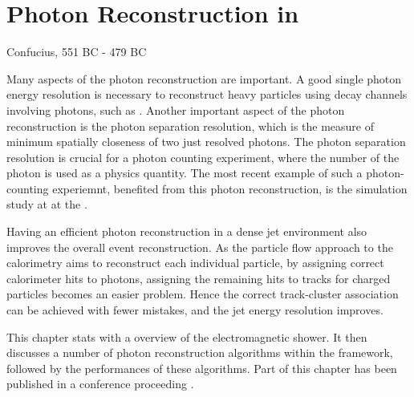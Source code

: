 \chapter{Photon Reconstruction in \pandora}
\label{chap:Photon}

%
{Confucius, 551 BC - 479 BC}

Many aspects of the photon reconstruction are important. A good single photon energy resolution is necessary to reconstruct heavy particles using decay channels involving photons, such as \HepProcess{\Ppizero\to\Pgamma\Pgamma}. Another important aspect of the photon reconstruction is the photon separation resolution, which is the measure of minimum spatially closeness of two just resolved photons. The photon separation resolution is crucial for a photon counting experiment, where the number of the photon is used as a physics quantity. The most recent example of such a photon-counting experiemnt, benefited from this photon reconstruction, is the  \HepProcess{\PHiggs \to \Pgamma \Pgamma} simulation study at  at the \CLIC \cite{Kacarevic:higgsToGammaGamma}.

Having an efficient photon reconstruction in a dense jet environment also improves the overall event reconstruction. As the particle flow approach to the calorimetry aims to reconstruct each individual particle, by assigning correct calorimeter hits to photons, assigning the remaining hits to tracks for charged particles becomes an easier problem. Hence the correct track-cluster association can be achieved with fewer mistakes, and the jet energy resolution improves.

This chapter stats with a overview of the electromagnetic shower. It then discusses a number of photon reconstruction algorithms within the \pandora framework, followed by the performances of these algorithms. Part of this chapter has been published in a conference proceeding \cite{Xu:2016rcz}.


